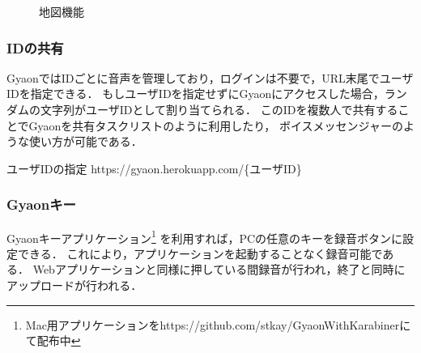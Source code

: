 \begin{figure}[H]
\centering
{}
\caption{地図機能}
\label{map}
\end{figure}

\subsubsection{IDの共有}
GyaonではIDごとに音声を管理しており，ログインは不要で，URL末尾でユーザIDを指定できる．
もしユーザIDを指定せずにGyaonにアクセスした場合，ランダムの文字列がユーザIDとして割り当てられる．
このIDを複数人で共有することでGyaonを共有タスクリストのように利用したり，
ボイスメッセンジャーのような使い方が可能である．

\begin{itembox}[l]
{ユーザIDの指定}
https://gyaon.herokuapp.com/\{ユーザID\}
\end{itembox}

\subsubsection{Gyaonキー}
Gyaonキーアプリケーション\footnote{\textsf{Mac用アプリケーションをhttps://github.com/stkay/GyaonWithKarabinerにて配布中}}
を利用すれば，PCの任意のキーを録音ボタンに設定できる．
これにより，アプリケーションを起動することなく録音可能である．
Webアプリケーションと同様に押している間録音が行われ，終了と同時にアップロードが行われる．

